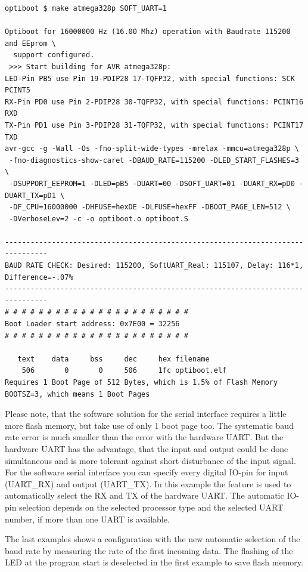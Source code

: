 \begin{verbatim}
optiboot $ make atmega328p SOFT_UART=1

Optiboot for 16000000 Hz (16.00 Mhz) operation with Baudrate 115200 and EEprom \
  support configured.
 >>> Start building for AVR atmega328p:
LED-Pin PB5 use Pin 19-PDIP28 17-TQFP32, with special functions: SCK PCINT5
RX-Pin PD0 use Pin 2-PDIP28 30-TQFP32, with special functions: PCINT16 RXD
TX-Pin PD1 use Pin 3-PDIP28 31-TQFP32, with special functions: PCINT17 TXD
avr-gcc -g -Wall -Os -fno-split-wide-types -mrelax -mmcu=atmega328p \
 -fno-diagnostics-show-caret -DBAUD_RATE=115200 -DLED_START_FLASHES=3 \
 -DSUPPORT_EEPROM=1 -DLED=pB5 -DUART=00 -DSOFT_UART=01 -DUART_RX=pD0 -DUART_TX=pD1 \
 -DF_CPU=16000000 -DHFUSE=hexDE -DLFUSE=hexFF -DBOOT_PAGE_LEN=512 \
 -DVerboseLev=2 -c -o optiboot.o optiboot.S

--------------------------------------------------------------------------------
BAUD RATE CHECK: Desired: 115200, SoftUART_Real: 115107, Delay: 116*1, Difference=-.07%
--------------------------------------------------------------------------------
# # # # # # # # # # # # # # # # # # # # # #
Boot Loader start address: 0x7E00 = 32256
# # # # # # # # # # # # # # # # # # # # # #

   text    data     bss     dec     hex filename
    506       0       0     506     1fc optiboot.elf
Requires 1 Boot Page of 512 Bytes, which is 1.5% of Flash Memory
BOOTSZ=3, which means 1 Boot Pages

\end{verbatim}

Please note, that the software solution for the serial interface requires a little more flash memory,
but take use of only 1 boot page too. The systematic baud rate error is much smaller than the error with the hardware UART.
But the hardware UART has the advantage, that the input and output could be done simultaneous and is more tolerant against
short disturbance of the input signal.
For the software serial interface you can specify every digital IO-pin for input (UART\_RX) and output (UART\_TX). 
In this example the feature is used to automatically select the RX and TX of the hardware UART.
The automatic IO-pin selection depends on the selected processor type and the selected UART number, if more than
one UART is available.


The last examples shows a configuration with the new automatic selection of the baud rate
by measuring the rate of the first incoming data.
The flashing of the LED at the program start is deselected in the first example to save flash memory.

